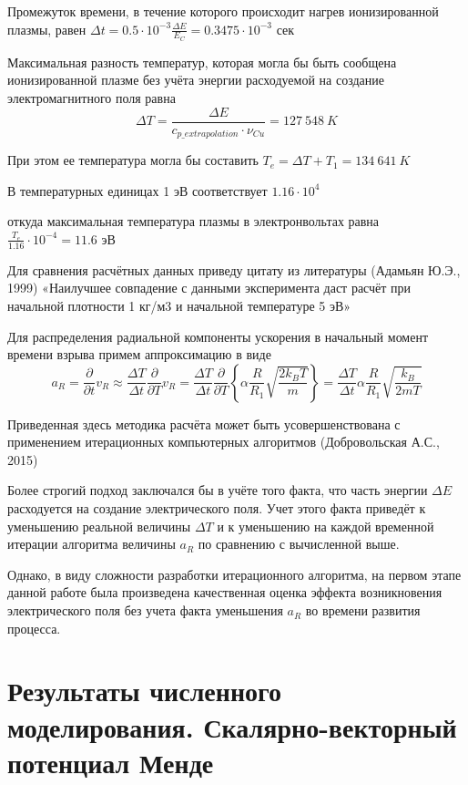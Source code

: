 \documentclass[12pt]{article}
\begin{document}
Промежуток времени, в течение которого происходит нагрев ионизированной плазмы, равен 
$\Delta t=0.5\cdot {{10}^{-3}}\frac{\Delta E}{{{E}_{C}}}=0.3475\cdot {{10}^{-3}}$ сек

Максимальная разность температур, которая могла бы быть сообщена ионизированной плазме без учёта энергии расходуемой на создание электромагнитного поля равна \[\Delta T=\frac{\Delta E}{{{c}_{p\_extrapolation}}\cdot {{\nu }_{Cu}}}=127\ 548\ K\] 

При этом ее температура могла бы составить ${{T}_{e}}=\Delta T+{{T}_{1}}=134\ 641\ K$ 

В температурных единицах 1 эВ соответствует ${1.16}\cdot{{10}^{4}}\ $

откуда максимальная температура плазмы в электронвольтах равна $\frac{{{T}_{e}}}{1.16}\cdot{{10}^{-4}}=11.6$  эВ

Для сравнения расчётных данных приведу цитату из литературы (Адамьян Ю.Э., 1999) «Наилучшее совпадение с данными эксперимента даст расчёт при начальной плотности 1 кг/м3 и начальной температуре 5 эВ»

Для распределения радиальной компоненты ускорения в начальный момент времени взрыва примем аппроксимацию в виде
$${{a}_{R}}=\frac{\partial }{\partial t}{{v}_{R}}\approx \frac{\Delta T}{\Delta t}\frac{\partial }{\partial T}{{v}_{R}}=\frac{\Delta T}{\Delta t}\frac{\partial }{\partial T}\left\{ \alpha \frac{R}{{{R}_{1}}}\sqrt{\frac{2{{k}_{B}}T}{m}} \right\}=\frac{\Delta T}{\Delta t}\alpha \frac{R}{{{R}_{1}}}\sqrt{\frac{{{k}_{B}}}{2mT}}$$

Приведенная здесь методика расчёта может быть усовершенствована с применением итерационных компьютерных алгоритмов (Добровольская А.С., 2015)

Более строгий подход заключался бы в учёте того факта, что часть энергии $\Delta E$ расходуется на создание электрического поля. Учет этого факта приведёт к уменьшению реальной величины $\Delta T$ и к уменьшению на каждой временной итерации алгоритма величины ${{a}_{R}}$ по сравнению с вычисленной выше. 

Однако, в виду сложности разработки итерационного алгоритма, на первом этапе данной работе была произведена качественная оценка эффекта возникновения электрического поля без учета факта уменьшения ${{a}_{R}}$ во времени развития процесса.


\section{Результаты численного моделирования. Скалярно-векторный потенциал Менде}
\end{document}
